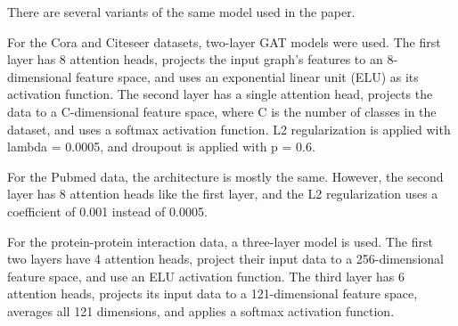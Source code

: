There are several variants of the same model used in the paper.

For the Cora and Citeseer datasets, two-layer GAT models were used.
The first layer has 8 attention heads, projects the input graph's features to an
8-dimensional feature space, and uses an exponential linear unit (ELU) as its
activation function.
The second layer has a single attention head, projects the data to a C-dimensional feature space, where C is the number of classes in
the dataset, and uses a softmax activation function.
L2 regularization is applied with lambda = 0.0005, and droupout is applied with p = 0.6.

For the Pubmed data, the architecture is mostly the same. However, the second
layer has 8 attention heads like the first layer, and the L2 regularization
uses a coefficient of 0.001 instead of 0.0005.

For the protein-protein interaction data, a three-layer model is used. The
first two layers have 4 attention heads, project their input data to a
256-dimensional feature space, and use an ELU activation function. The third
layer has 6 attention heads, projects its input data to a 121-dimensional
feature space, averages all 121 dimensions, and applies a softmax activation
function.